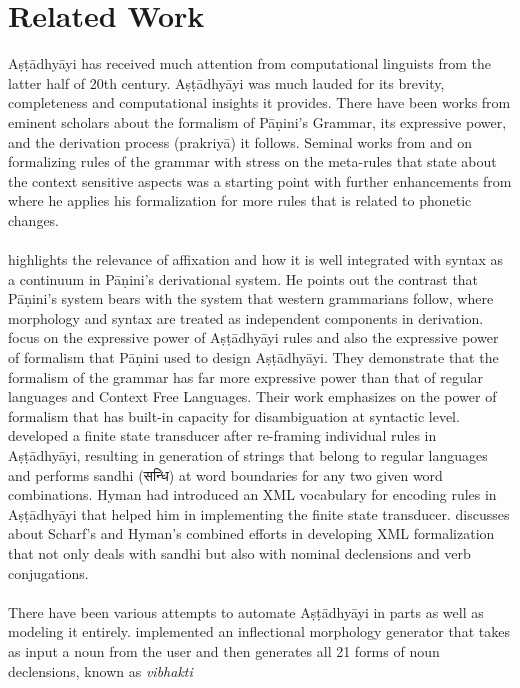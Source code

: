 \documentclass[11pt]{article}
\begin{document}
\section{Related Work}
\label{sect:related}
Aṣṭādhyāyi has received much attention from computational linguists from the latter half of
20th century. Aṣṭādhyāyi was much lauded for its brevity, completeness and computational
insights it provides. There have been works from eminent scholars about the formalism of Pāṇini’s Grammar, its expressive power, and the derivation process (prakriyā) it follows. Seminal works from  and   on formalizing rules of the grammar with stress on the meta-rules that state about the context sensitive aspects was a starting point with further enhancements from  where he applies his formalization for more rules that is related to phonetic changes. 
\\ \\
 highlights the relevance of affixation and how it is well integrated with syntax as a continuum in Pāṇini’s derivational system. He points out the contrast that Pāṇini’s system bears with the system that western grammarians follow, where morphology and syntax are treated as independent components in derivation.  focus on the expressive power of
Aṣṭādhyāyi rules and also the expressive power of formalism that Pāṇini used to design
Aṣṭādhyāyi. They demonstrate that the formalism of the grammar has far more expressive power than that of regular languages and Context Free Languages. Their work emphasizes on the power of formalism that has built-in capacity for disambiguation at syntactic level.  developed a finite state transducer after re-framing individual rules in Aṣṭādhyāyi, resulting in generation of strings that belong to regular languages and performs sandhi ({\skt सन्धि}) at word boundaries for any two given word combinations. Hyman had introduced an XML vocabulary for encoding rules in Aṣṭādhyāyi that helped him in implementing the finite state transducer.  discusses about Scharf's and Hyman's combined efforts in developing XML formalization that not only deals with sandhi but also with nominal declensions and verb conjugations. 
\\ \\
There have been various attempts to automate Aṣṭādhyāyi in parts as well as modeling it entirely.  implemented an inflectional morphology generator that takes as input a noun
from the user and then generates all 21 forms of noun declensions, known as {\sl vibhakti}
\end{document}

